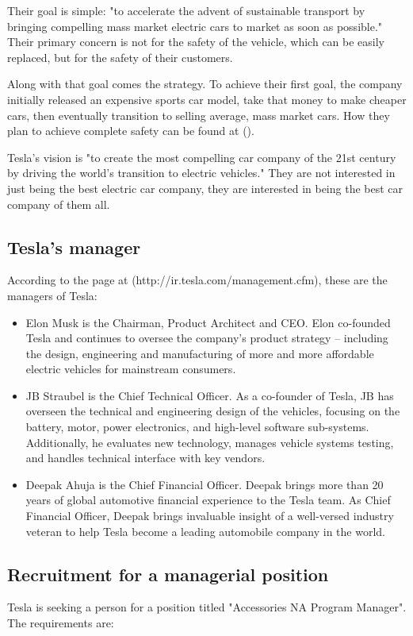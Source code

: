 \documentclass[12pt]{article}
\begin{document}
Their goal is simple: "to accelerate the advent of sustainable transport by bringing compelling mass market electric cars to market as soon as possible." Their primary concern is not for the safety of the vehicle, which can be easily replaced, but for the safety of their customers.

Along with that goal comes the strategy. To achieve their first goal, the company initially released an expensive sports car model, take that money to make cheaper cars, then eventually transition to selling average, mass market cars. How they plan to achieve complete safety can be found at (\cite{mu13}).

Tesla's vision is "to create the most compelling car company of the 21st century by driving the world’s transition to electric vehicles." They are not interested in just being the best electric car company, they are interested in being the best car company of them all.

\subsection{Tesla's manager}

According to the page at (http://ir.tesla.com/management.cfm), these are the managers of Tesla:

\begin{itemize}
	\item{Elon Musk is the Chairman, Product Architect and CEO. Elon co-founded Tesla and continues to oversee the company's product strategy -- including the design, engineering and manufacturing of more and more affordable electric vehicles for mainstream consumers.}
	\item{JB Straubel is the Chief Technical Officer. As a co-founder of Tesla, JB has overseen the technical and engineering design of the vehicles, focusing on the battery, motor, power electronics, and high-level software sub-systems. Additionally, he evaluates new technology, manages vehicle systems testing, and handles technical interface with key vendors.}
	\item{Deepak Ahuja is the Chief Financial Officer. Deepak brings more than 20 years of global automotive financial experience to the Tesla team. As Chief Financial Officer, Deepak brings invaluable insight of a well-versed industry veteran to help Tesla become a leading automobile company in the world.}

\end{itemize}

\subsection{Recruitment for a managerial position}
Tesla is seeking a person for a position titled "Accessories NA Program Manager". The requirements are:
\end{document}
